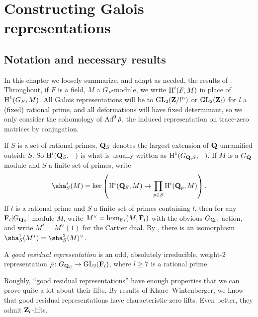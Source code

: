 
\chapter{Constructing Galois representations}\label{ch:construct-Galois}





\section{Notation and necessary results}

In this chapter we loosely summarize, and adapt as needed, the results of 
\cite{khare-larsen-ramakrishna-2005,pande-2011}. Throughout, if $F$ is a field, 
$M$ a $G_F$-module, we write $\operatorname{H}^i(F,M)$ in place of $\operatorname{H}^1(G_F,M)$. All Galois 
representations will be to $\operatorname{GL}_2(\mathbf{Z}/l^n)$ or $\operatorname{GL}_2(\mathbf{Z}_l)$ for $l$ a (fixed) 
rational prime, and all deformations will have fixed determinant, so we only 
consider the cohomology of $\operatorname{Ad}^0\bar\rho$, the induced representation on 
trace-zero matrices by conjugation. 

If $S$ is a set of rational primes, $\mathbf{Q}_S$ denotes the largest extension of 
$\mathbf{Q}$ unramified outside $S$. So $\operatorname{H}^i(\mathbf{Q}_S,-)$ is what is usually written as 
$\operatorname{H}^1(G_{\mathbf{Q},S},-)$. If $M$ is a $G_{\mathbf{Q}}$-module and $S$ a finite set of primes, 
write 
\[
	\sha^i_S(M) = \ker\left( \h^i(\bQ_S,M) \to \prod_{p\in S} \h^i(\bQ_p,M)\right) .
\]
If $l$ is a rational prime and $S$ a finite set of primes containing $l$, then 
for any $\mathbf{F}_l[G_{\mathbf{Q}_S}]$-module $M$, write $M^\vee=\hom_{\mathbf{F}_l}(M,\mathbf{F}_l)$ 
with the obvious $G_{\mathbf{Q}_S}$-action, and write $M^\ast = M^\vee(1)$ for the 
Cartier dual. By \cite[Th.~8.6.7]{neukirch-schmidt-winberg-2008}, there is an 
isomorphism $\sha^1_S(M^\ast) = \sha_S^2(M)^\vee$. 

\begin{definition}
A \emph{good residual representation} is an odd, absolutely irreducible, 
weight-$2$ representation $\bar\rho\colon G_{\mathbf{Q}_S} \to \operatorname{GL}_2(\mathbf{F}_l)$, where 
$l\geqslant 7$ is a rational prime. 
\end{definition}

Roughly, ``good residual representations'' have enough properties that we can 
prove quite a lot about their lifts. By results of Khare--Wintenberger, we know 
that good residual representations have characteristic-zero lifts. Even better, 
they admit $\mathbf{Z}_l$-lifts. 

